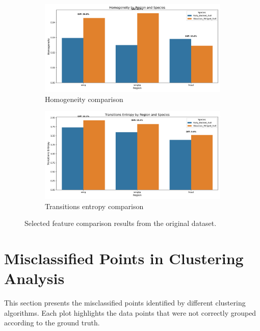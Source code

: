 \documentclass[a4paper,12pt]{report}
\begin{document}
\begin{figure}[H]
    \begin{subfigure}[t]{0.48\textwidth}
        \centering
        \includegraphics[width=\textwidth]{images/appendix/Original/homogeneity_comparison.png}
        \caption{Homogeneity comparison}
    \end{subfigure}
    \hfill
    \begin{subfigure}[t]{0.48\textwidth}
        \centering
        \includegraphics[width=\textwidth]{images/appendix/Original/transitions_entropy_comparison.png}
        \caption{Transitions entropy comparison}
    \end{subfigure}
    
    \caption{Selected feature comparison results from the original dataset.}
\end{figure}

\section{Misclassified Points in Clustering Analysis}

This section presents the misclassified points identified by different clustering algorithms. Each plot highlights the data points that were not correctly grouped according to the ground truth.
\end{document}
